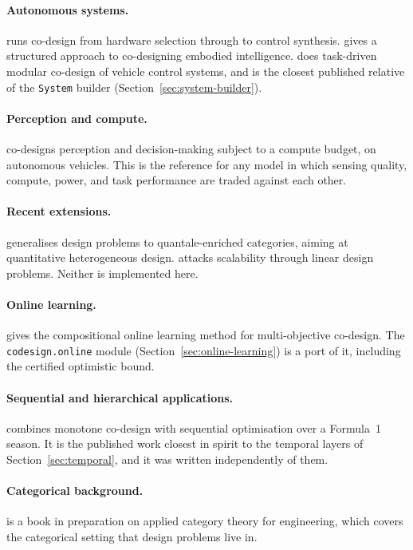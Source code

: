 \documentclass[11pt,a4paper]{article}
\begin{document}
\paragraph{Autonomous systems.} \citet{zardini2021autonomous} runs
co-design from hardware selection through to control synthesis.
\citet{zardini2021embodied} gives a structured approach to co-designing
embodied intelligence. \citet{zardini2022taskdriven} does task-driven
modular co-design of vehicle control systems, and is the closest published
relative of the \texttt{System} builder
(Section~\ref{sec:system-builder}).

\paragraph{Perception and compute.} \citet{milojevic2025codei} co-designs
perception and decision-making subject to a compute budget, on autonomous
vehicles. This is the reference for any model in which sensing quality,
compute, power, and task performance are traded against each other.

\paragraph{Recent extensions.} \citet{riess2026quantale} generalises
design problems to quantale-enriched categories, aiming at quantitative
heterogeneous design. \citet{cai2026scalable} attacks scalability through
linear design problems. Neither is implemented here.

\paragraph{Online learning.} \citet{alharbi2026online} gives the
compositional online learning method for multi-objective co-design. The
\texttt{codesign.online} module (Section~\ref{sec:online-learning}) is a
port of it, including the certified optimistic bound.

\paragraph{Sequential and hierarchical applications.}
\citet{neumann2025formula1} combines monotone co-design with sequential
optimisation over a Formula~1 season. It is the published work closest in
spirit to the temporal layers of Section~\ref{sec:temporal}, and it was
written independently of them.

\paragraph{Categorical background.} \citet{censi2026act4e} is a book in
preparation on applied category theory for engineering, which covers the
categorical setting that design problems live in.
\end{document}
